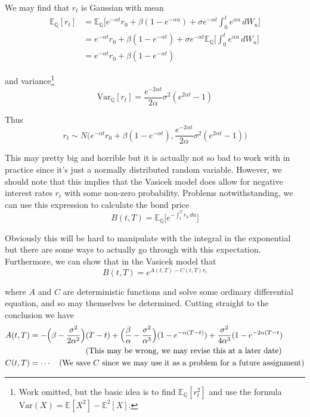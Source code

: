 \documentclass[12pt]{article}
\newlength\tindent
\renewcommand{\indent}{\hspace*{\tindent}}
\begin{document}
We may find that $r_t$ is Gaussian with mean
\begin{align*}
	\mathbb E_{\mathbb Q}[r_t] &= \mathbb E_{\mathbb Q}\Big[ e^{-\alpha t}r_0 + \beta(1 - e^{-\alpha u}) + \sigma e^{-\alpha t}\int^t_0 e^{\alpha u}\,dW_u \Big] \\
	&= e^{-\alpha t}r_0 + \beta(1 - e^{-\alpha t}) + \sigma e^{-\alpha t}\mathbb E_{\mathbb Q}\Big[ \int^t_0 e^{\alpha u}\,dW_u \Big] \\
	&= e^{-\alpha t}r_0 + \beta(1 - e^{-\alpha t})
\end{align*}

and variance\footnote{Work omitted, but the basic idea is to find $\mathbb E_{\mathbb Q}[r_t^2]$ and use the formula $\mathrm{Var}(X) = \mathbb E[X^2] - \mathbb E^2[X]$.}
\begin{equation*}
	\mathrm{Var}_{\mathbb Q}[r_t] = \frac{e^{-2\alpha t}}{2\alpha}\sigma^2(e^{2\alpha t} - 1)
\end{equation*}

Thus
\begin{equation*}
	r_t \sim N\Big(e^{-\alpha t}r_0 + \beta(1 - e^{-\alpha t}), \frac{e^{-2\alpha t}}{2\alpha}\sigma^2(e^{2\alpha t} - 1)\Big)
\end{equation*}

\indent This may pretty big and horrible but it is actually not so bad to work with in practice since it's just a normally distributed random variable. However, we should note that this implies that the Vasicek model does allow for negative interest rates $r_t$ with some non-zero probability. Problems notwithstanding, we can use this expression to calculate the bond price
\begin{equation*}
	B(t,T) = \mathbb E_{\mathbb Q}\Big[e^{-\int^T_t r_u\,du} \Big]
\end{equation*}

\indent Obviously this will be hard to manipulate with the integral in the exponential but there are some ways to actually go through with this expectation. Furthermore, we can show that in the Vasicek model that
\begin{equation*}
	B(t,T) = e^{A(t,T) - C(t,T)r_t}
\end{equation*}

where $A$ and $C$ are deterministic functions and solve some ordinary differential equation, and so may themselves be determined. Cutting straight to the conclusion we have
\begin{align*}
	A(t,T) &= -\Big(\beta - \frac{\sigma^2}{2\alpha^2}\Big)(T - t) + \Big(\frac{\beta}{\alpha} - \frac{\sigma^2}{\alpha^3}\Big)(1 - e^{-\alpha(T - t)}) + \frac{\sigma^2}{4\alpha^3}(1 - e^{-2\alpha(T - t}) \\
	&\hphantom{{}={-\Big(\beta - \frac{\sigma^2}{2\alpha^2}\Big)}} \text{(This may be wrong, we may revise this at a later date)} \\
	C(t,T) &= \cdots \quad \text{(We save $C$ since we may use it as a problem for a future assignment)}
\end{align*}
\end{document}

